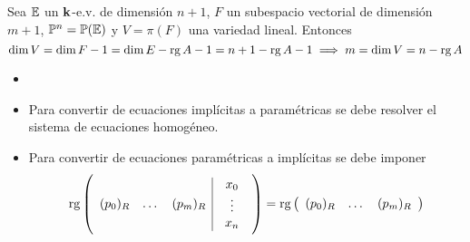 \begin{obs}
        Sea $\mathbb{E}$ un $\mathbf{k}$-e.v. de dimensión $n+1$, $F$ un subespacio vectorial de dimensión $m+1$, $\mathbb{P}^n = \mathbb{P}(\mathbb{E})$ y $V = \pi(F)$
        una variedad lineal.
        Entonces
        \[\dim V = \dim F - 1 = \dim E - \operatorname{rg} A - 1 = n+1 - \operatorname{rg} A - 1 \implies m = \dim V = n - \operatorname{rg} A\]        
\end{obs}
\begin{obs}
    \begin{itemize}
        \item[]
        \item Para convertir de ecuaciones implícitas a paramétricas se debe resolver el sistema de ecuaciones homogéneo.
        \item Para convertir de ecuaciones paramétricas a implícitas se debe imponer
        \[
            \operatorname{rg}
            \left(
            \begin{array}{ccc|c}
                (p_0)_R & \dots & (p_m)_R & \begin{array}{c}x_0 \\ \vdots \\ x_n \end{array} \\
            \end{array}
            \right)
            =
            \operatorname{rg}
            \left(
            \begin{array}{ccc}
                (p_0)_R & \dots & (p_m)_R\\
            \end{array}
            \right)
        \]
    \end{itemize}
\end{obs}
